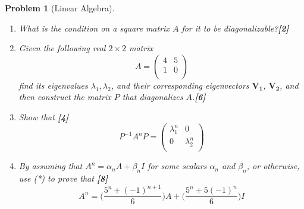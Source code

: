 \documentclass[a4paper]{article}
\theoremstyle{new}
\newtheorem{qns}{Problem}[section]
\begin{document}
\newpage
\begin{qns}[Linear Algebra]\leavevmode
\begin{enumerate}[label=(\alph*)]
\item  What is the condition on a square matrix $A$ for it to be diagonalizable?\hfill \textbf{[2]}
\item Given the following real $2\times 2$ matrix
$$A=\begin{pmatrix}4&5\\1&0\\\end{pmatrix}$$
find its eigenvalues $\lambda_1,\lambda_2$, and their corresponding eigenvectors $\mathbf{V_1}$, $\mathbf{V_2}$, and then construct the matrix $P$ that diagonalizes $A$.\hfill \textbf{[6]}
\item Show that \hfill \textbf{[4]}
\begin{equation}
  P^{-1}A^nP=\begin{pmatrix}\lambda_1^n&0\\0&\lambda_2^n\\\end{pmatrix}\tag{*}
\end{equation}
\item By assuming that  $A^n=\alpha_nA+\beta_nI$ for some scalars $\alpha_n$ and $\beta_n$, or otherwise, use (*) to prove that \hfill \textbf{[8]}
$$A^n=\bigg(\frac{5^n+(-1)^{n+1}}{6}\bigg)A+\bigg(\frac{5^n+5(-1)^n}{6}\bigg)I$$
\end{enumerate}
\end{qns}
\end{document}
